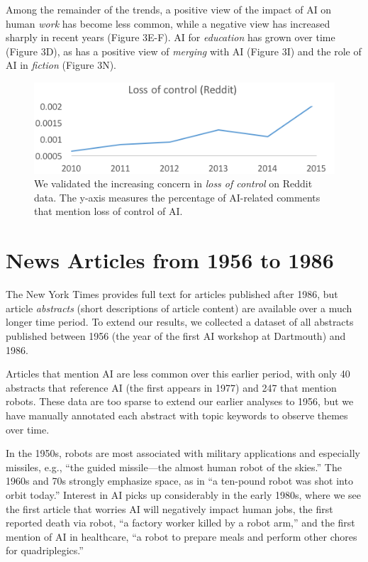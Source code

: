 \documentclass[letterpaper]{article}
\begin{document}
Among the remainder of the trends, a positive view of the impact of AI on human \textit{work} has become less common, while a negative view has increased sharply in recent years (Figure 3E-F). AI for \textit{education} has grown over time (Figure 3D), as has a positive view of \textit{merging} with AI (Figure 3I) and the role of AI in \textit{fiction} (Figure 3N).

\begin{figure}[!t]
\centering
\includegraphics[width=1.0\columnwidth]{ai-reddit2}
\caption{We validated the increasing concern in \textit{loss of control} on Reddit data. The y-axis measures the percentage of AI-related comments that mention loss of control of AI.}
\label{fig:replicate}
\end{figure}

\section{News Articles from 1956 to 1986}

The New York Times provides full text for articles published after 1986, but article \textit{abstracts} (short descriptions of article content) are available over a much longer time period. To extend our results, we collected a dataset of all abstracts published between 1956 (the year of the first AI workshop at Dartmouth) and 1986.

Articles that mention AI are less common over this earlier period, with only 40 abstracts that reference AI (the first appears in 1977) and 247 that mention robots. These data are too sparse to extend our earlier analyses to 1956, but we have manually annotated each abstract with topic keywords to observe themes over time.

In the 1950s, robots are most associated with military applications and especially missiles, e.g., ``the guided missile---the almost human robot of the skies.'' The 1960s and 70s strongly emphasize space, as in ``a ten-pound robot was shot into orbit today.'' Interest in AI picks up considerably in the early 1980s, where we see the first article that worries AI will negatively impact human jobs, the first reported death via robot, ``a factory worker killed by a robot arm,'' and the first mention of AI in healthcare, ``a robot to prepare meals and perform other chores for quadriplegics.''
\end{document}
